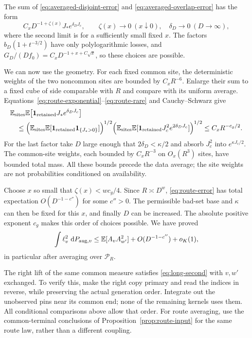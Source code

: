 The sum of \eqref{eq:averaged-disjoint-error} and
\eqref{eq:averaged-overlap-error} has the form
\begin{equation}\label{eq:route-error}
 C_xD^{-1+\zeta(x)}J_*e^{\delta_DJ_c},\qquad
 \zeta(x)\longrightarrow0\ (x\downarrow0),\quad
 \delta_D\longrightarrow0\ (D\to\infty),
\end{equation}
where the second limit is for a sufficiently small fixed $x$.
The factors $b_D(1+t^{-3/2})$ have only polylogarithmic losses,
and $G_D/(Df_0)=C_xD^{-1+x+C\sqrt x}$, so these choices are
possible.

We can now use the geometry.  For each fixed common site, the
deterministic weights of the two noncommon sites are bounded
by $C_xR^{-6}$.  Enlarge their sum to a fixed cube of side
comparable with $R$ and compare with its uniform average.
Equations~\eqref{eq:route-exponential}--\eqref{eq:route-rare}
and Cauchy--Schwarz give
\begin{align*}
 &\mathbb E_{\rm sites}\mathbb E\bigl[
       \mathbf 1_{\rm retained}J_*e^{\delta_DJ_c}\bigr]\\
 &\quad\le
  \Bigl(\mathbb E_{\rm sites}\mathbb E[
       \mathbf 1_{\rm retained}\mathbf 1_{\{J_*>0\}}]\Bigr)^{1/2}
  \Bigl(\mathbb E_{\rm sites}\mathbb E[
       \mathbf 1_{\rm retained}J_c^2e^{2\delta_DJ_c}]\Bigr)^{1/2}
 \le C_xR^{-c_g/2}.
\end{align*}
For the last factor take $D$ large enough that $2\delta_D<\kappa/2$
and absorb $J_c^2$ into $e^{\kappa J_c/2}$.  The common-site
weights, each bounded by $C_xR^{-3}$ on $O_x(R^3)$ sites, have
bounded total mass.  All these bounds precede the data average;
the site weights are not probabilities conditioned on availability.

Choose $x$ so small that $\zeta(x)<wc_g/4$.  Since
$R\asymp D^w$, \eqref{eq:route-error} has total expectation
$O(D^{-1-c''})$ for some $c''>0$.  The permissible bad-set base
and $\kappa$ can then be fixed for this $x$, and finally $D$ can
be increased.  The absolute positive exponent $c_g$ makes this
order of choices possible.  We have proved
\begin{equation}\label{eq:long-second}
 \int\ell_v^2\,\,\mathrm d P_{{\rm aug},v}
 \le \mathbb E[A_vA_{w'}^2]+O(D^{-1-c''})+o_K(1),
\end{equation}
in particular after averaging over $\mathcal P_R$.

The right lift of the same common measure satisfies
\eqref{eq:long-second} with $v,w'$ exchanged.  To verify this,
make the right copy primary and read the indices in reverse,
while preserving the actual generation order.  Integrate out
the unobserved pins near its common end; none of the remaining
kernels uses them.  All conditional comparisons above allow
that order.  For route averaging, use the common-terminal
conclusions of Proposition~\ref{prop:route-input} for the same
route law, rather than a different coupling.

